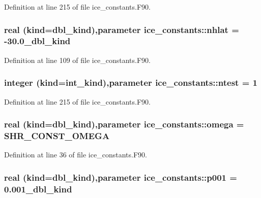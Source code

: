 Definition at line 215 of file ice\_\-constants.F90.\hypertarget{namespaceice__constants_aa70b4958fc93295f5b57f1dd21fd4ebe}{
\subsubsection[{nhlat}]{\setlength{\rightskip}{0pt plus 5cm}real (kind=dbl\_\-kind),parameter {\bf ice\_\-constants::nhlat} = -\/30.0\_\-dbl\_\-kind}}
\label{namespaceice__constants_aa70b4958fc93295f5b57f1dd21fd4ebe}


Definition at line 109 of file ice\_\-constants.F90.\hypertarget{namespaceice__constants_a27deecaf56e53c5ea7ceb62b33d530d6}{
\subsubsection[{ntest}]{\setlength{\rightskip}{0pt plus 5cm}integer (kind=int\_\-kind),parameter {\bf ice\_\-constants::ntest} = 1}}
\label{namespaceice__constants_a27deecaf56e53c5ea7ceb62b33d530d6}


Definition at line 215 of file ice\_\-constants.F90.\hypertarget{namespaceice__constants_ab975492734f7183079c68d7b88d27146}{
\subsubsection[{omega}]{\setlength{\rightskip}{0pt plus 5cm}real (kind=dbl\_\-kind),parameter {\bf ice\_\-constants::omega} = SHR\_\-CONST\_\-OMEGA}}
\label{namespaceice__constants_ab975492734f7183079c68d7b88d27146}


Definition at line 36 of file ice\_\-constants.F90.\hypertarget{namespaceice__constants_a32bc94e42275169979f5be642d23634e}{
\subsubsection[{p001}]{\setlength{\rightskip}{0pt plus 5cm}real (kind=dbl\_\-kind),parameter {\bf ice\_\-constants::p001} = 0.001\_\-dbl\_\-kind}}
\label{namespaceice__constants_a32bc94e42275169979f5be642d23634e}



